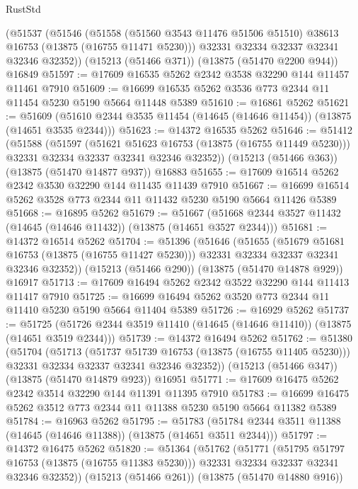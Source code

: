 \begin{lexlean}{RustStd}
\begin{coremodule}
    (@51537
      (@51546
        (@51558 (@51560 @3543 @11476 @51506 @51510) @38613 @16753 (@13875 (@16755 @11471 @5230)))
        @32331
        @32334
        @32337
        @32341
        @32346
        @32352))
    (@15213 (@51466 @371))
    (@13875 (@51470 @2200 @944))
    @16849
@51597 := @17609 @16535 @5262 @2342 @3538 @32290 @144 @11457 @11461 @7910
@51609 := @16699 @16535 @5262 @3536 @773 @2344 @11 @11454 @5230 @5190 @5664 @11448 @5389
@51610 := @16861 @5262
@51621 := @51609 (@51610 @2344 @3535 @11454 (@14645 (@14646 @11454)) (@13875 (@14651 @3535 @2344)))
@51623 := @14372 @16535 @5262
@51646 := @51412
    (@51588
      (@51597
        (@51621 @51623 @16753 (@13875 (@16755 @11449 @5230)))
        @32331
        @32334
        @32337
        @32341
        @32346
        @32352))
    (@15213 (@51466 @363))
    (@13875 (@51470 @14877 @937))
    @16883
@51655 := @17609 @16514 @5262 @2342 @3530 @32290 @144 @11435 @11439 @7910
@51667 := @16699 @16514 @5262 @3528 @773 @2344 @11 @11432 @5230 @5190 @5664 @11426 @5389
@51668 := @16895 @5262
@51679 := @51667 (@51668 @2344 @3527 @11432 (@14645 (@14646 @11432)) (@13875 (@14651 @3527 @2344)))
@51681 := @14372 @16514 @5262
@51704 := @51396
    (@51646
      (@51655
        (@51679 @51681 @16753 (@13875 (@16755 @11427 @5230)))
        @32331
        @32334
        @32337
        @32341
        @32346
        @32352))
    (@15213 (@51466 @290))
    (@13875 (@51470 @14878 @929))
    @16917
@51713 := @17609 @16494 @5262 @2342 @3522 @32290 @144 @11413 @11417 @7910
@51725 := @16699 @16494 @5262 @3520 @773 @2344 @11 @11410 @5230 @5190 @5664 @11404 @5389
@51726 := @16929 @5262
@51737 := @51725 (@51726 @2344 @3519 @11410 (@14645 (@14646 @11410)) (@13875 (@14651 @3519 @2344)))
@51739 := @14372 @16494 @5262
@51762 := @51380
    (@51704
      (@51713
        (@51737 @51739 @16753 (@13875 (@16755 @11405 @5230)))
        @32331
        @32334
        @32337
        @32341
        @32346
        @32352))
    (@15213 (@51466 @347))
    (@13875 (@51470 @14879 @923))
    @16951
@51771 := @17609 @16475 @5262 @2342 @3514 @32290 @144 @11391 @11395 @7910
@51783 := @16699 @16475 @5262 @3512 @773 @2344 @11 @11388 @5230 @5190 @5664 @11382 @5389
@51784 := @16963 @5262
@51795 := @51783 (@51784 @2344 @3511 @11388 (@14645 (@14646 @11388)) (@13875 (@14651 @3511 @2344)))
@51797 := @14372 @16475 @5262
@51820 := @51364
    (@51762
      (@51771
        (@51795 @51797 @16753 (@13875 (@16755 @11383 @5230)))
        @32331
        @32334
        @32337
        @32341
        @32346
        @32352))
    (@15213 (@51466 @261))
    (@13875 (@51470 @14880 @916))

\end{coremodule}
\end{lexlean}

